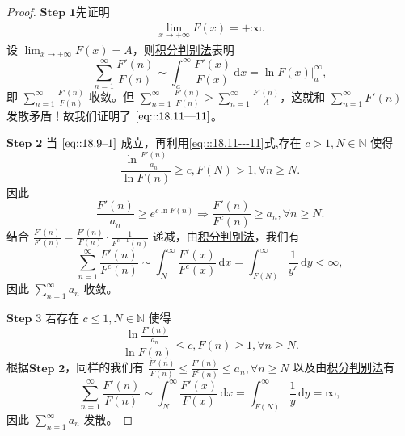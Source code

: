 \documentclass[../../main.tex]{subfiles}%
\begin{document}
\begin{proof}
$\mathbf{Step}\,\,\mathbf{1}$先证明
\begin{align}
\lim_{x \to +\infty} F(x) = +\infty. \label{eq:::18.11---11}
\end{align}
设 \(\lim_{x \to +\infty} F(x) = A\)，则\hyperref[theorem:积分判别法]{积分判别法}表明
\[
\sum_{n=1}^\infty \frac{F'(n)}{F(n)} \sim \int_a^\infty \frac{F'(x)}{F(x)} \, \mathrm{d}x = \ln F(x) \big|_a^\infty,
\]
即 \(\sum_{n=1}^\infty \frac{F'(n)}{F(n)}\) 收敛。但 \(\sum_{n=1}^\infty \frac{F'(n)}{F(n)} \geqslant \sum_{n=1}^\infty \frac{F'(n)}{A}\)，这就和 \(\sum_{n=1}^\infty F'(n)\) 发散矛盾！故我们证明了 \(\eqref{eq:::18.11---11}\)。

$\mathbf{Step}\,\,\mathbf{2}$ 当 \(\eqref{eq::18.9--1}\) 成立，再利用\eqref{eq:::18.11---11}式,存在 \( c > 1, N \in \mathbb{N} \) 使得
\[
\frac{\ln \frac{F'(n)}{a_n}}{\ln F(n)} \geqslant c,F(N)>1, \forall n \geqslant N.
\]
因此
\[
\frac{F'(n)}{a_n} \geqslant e^{c \ln F(n)} \Rightarrow \frac{F'(n)}{F^c(n)} \geqslant a_n, \forall n \geqslant N.
\]
结合 \(\frac{F'(n)}{F^c(n)} = \frac{F'(n)}{F(n)} \cdot \frac{1}{F^{c - 1}(n)}\) 递减，由\hyperref[theorem:积分判别法]{积分判别法}，我们有
\[
\sum_{n=1}^\infty \frac{F'(n)}{F^c(n)} \sim \int_N^\infty \frac{F'(x)}{F^c(x)} \, \mathrm{d}x = \int_{F(N)}^\infty \frac{1}{y^c} \, \mathrm{d}y < \infty,
\]
因此 \(\sum_{n=1}^\infty a_n\) 收敛。

$\mathbf{Step}\,\,3$ 若存在 \( c \leqslant 1, N \in \mathbb{N} \) 使得
\[
\frac{\ln \frac{F'(n)}{a_n}}{\ln F(n)} \leqslant c, F(n) \geqslant 1, \forall n \geqslant N.
\]
根据$\mathbf{Step}\,\,\mathbf{2}$，同样的我们有 \(\frac{F'(n)}{F(n)} \leqslant \frac{F'(n)}{F^c(n)} \leqslant a_n, \forall n \geqslant N\) 以及由\hyperref[theorem:积分判别法]{积分判别法}有
\[
\sum_{n=1}^\infty \frac{F'(n)}{F(n)} \sim \int_N^\infty \frac{F'(x)}{F(x)} \, \mathrm{d}x = \int_{F(N)}^\infty \frac{1}{y} \, \mathrm{d}y = \infty,
\]
因此 \(\sum_{n=1}^\infty a_n\) 发散。
\end{proof}
\end{document}
